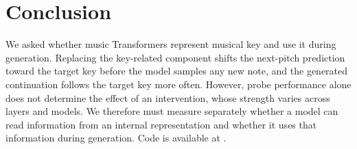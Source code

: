 \documentclass{article}
\begin{document}
\section{Conclusion}
We asked whether music Transformers represent musical key and use it during generation.
Replacing the key-related component shifts the next-pitch prediction toward the target key before the model samples any new note, and the generated continuation follows the target key more often.
However, probe performance alone does not determine the effect of an intervention, whose strength varies across layers and models.
We therefore must measure separately whether a model can read information from an internal representation and whether it uses that information during generation.
Code is available at \repourl.

\clearpage


\end{document}
